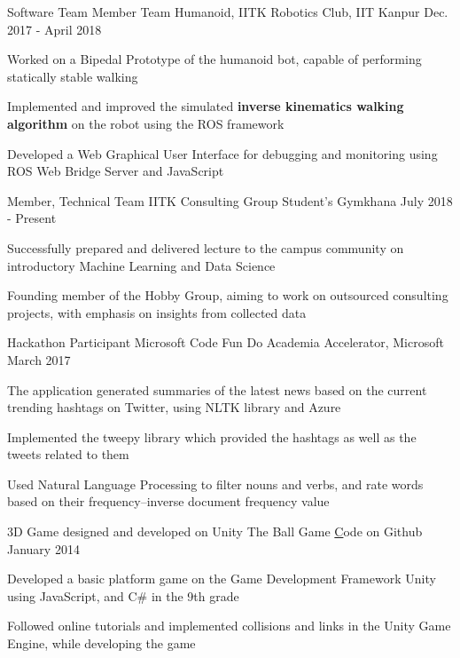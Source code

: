 
\begin{cventries}

  \cventry
    {Software Team Member} 
    {Team Humanoid, IITK}
    {Robotics Club, IIT Kanpur}
    {Dec. 2017 - April 2018} 
    {
      \begin{cvitems} 
        \item {Worked on a Bipedal Prototype of the humanoid bot, capable of performing statically stable walking}
        \item {Implemented and improved the simulated \textbf{inverse kinematics walking algorithm} on the robot using the ROS framework}
        \item {Developed a Web Graphical User Interface for debugging and monitoring using ROS Web Bridge Server and JavaScript}
      \end{cvitems}
    }

  \cventry
    {Member, Technical Team}
    {IITK Consulting Group}
    {Student's Gymkhana} 
    {July 2018 - Present}
    {
      \begin{cvitems}
        \item {Successfully prepared and delivered lecture to the campus community on introductory Machine Learning and Data Science}
        \item {Founding member of the Hobby Group, aiming to work on outsourced consulting projects, with emphasis on insights from collected data}
      \end{cvitems}
    }

  \cventry
    {Hackathon Participant}
    {Microsoft Code Fun Do} 
    {Academia Accelerator, Microsoft}
    {March 2017}
    {
      \begin{cvitems} 
        \item {The application generated summaries of the latest news based on the current trending hashtags on Twitter, using NLTK library and Azure}
        \item {Implemented the tweepy library which provided the hashtags as well as the tweets related to them}
        \item {Used Natural Language Processing to filter nouns and verbs, and rate words based on their frequency–inverse document frequency value}
      \end{cvitems}
    }

  \cventry
    {3D Game designed and developed on Unity} 
    {The Ball Game} 
    {\href{https://github.com/7ayushgupta/UnityGame}Code on Github}
    {January 2014}
    {
      \begin{cvitems}
        \item {Developed a basic platform game on the Game Development Framework Unity using JavaScript, and C\# in the 9th grade}
        \item {Followed online tutorials and implemented collisions and links in the Unity Game Engine, while developing the game}
      \end{cvitems}
    }

\end{cventries}
